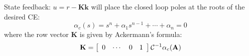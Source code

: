 State feedback: $u=r-\mathbf{K}\mathbf{k}$ will place the closed loop poles at the roots of the desired CE:
\[
\alpha_c(s) = s^n + \alpha_1s^{n-1} + \cdots + \alpha_n = 0
\]
where the row vector $\mathbf{K}$ is given by Ackermann's formula:
\[
\mathbf{K} = 
\left[ {\begin{array}{*{20}c}
   0 &  \cdots  & 0 & 1  \\
\end{array}} \right]
\mathcal{C}^{-1}\alpha_c(\mathbf A)
\]

\endinput

